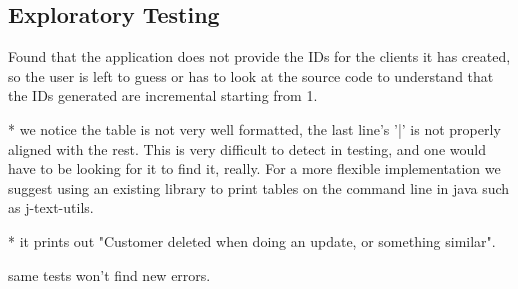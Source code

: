\subsection{Exploratory Testing}

Found that the application does not provide the IDs for the clients  it has created, so the user is left to guess or has to look at the source code to understand that the IDs generated are incremental starting from 1. 

* we notice the table is not very well formatted, the last line's '|' is not properly aligned with the rest. This is very difficult to detect in testing, and one would have to be looking for it to find it, really. For a more flexible implementation we suggest using an existing library to print tables on the command line in java such as j-text-utils. 

* it prints out "Customer deleted when doing an update, or something similar". 

same tests won't find new errors. 